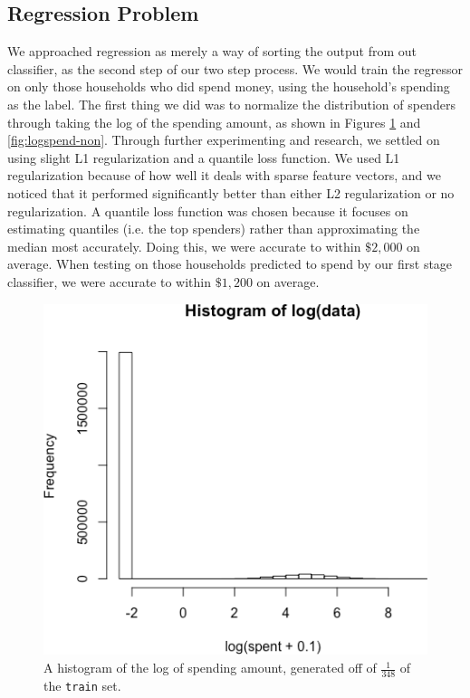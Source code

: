 \documentclass{article}
\begin{document}
\subsection*{Regression Problem}
We approached regression as merely a way of sorting the output from out classifier, as the second step of our two step process. We would train the regressor on only those households who did spend money, using the household's spending as the label. The first thing we did was to normalize the distribution of spenders through taking the log of the spending amount, as shown in Figures \ref{fig:logspend} and \ref{fig:logspend-non}. Through further experimenting and research, we settled on using slight L1 regularization and a quantile loss function. We used L1 regularization because of how well it deals with sparse feature vectors, and we noticed that it performed significantly better than either L2 regularization or no regularization. A quantile loss function was chosen because it focuses on estimating quantiles (i.e. the top spenders) rather than approximating the median most accurately. Doing this, we were accurate to within $\$2,000$ on average. When testing on those households predicted to spend by our first stage classifier, we were accurate to within $\$1,200$ on average.

\begin{figure}[H]
\begin{center}
	\includegraphics[width=.8 \linewidth]{log-spend.png}
\end{center}
	\vspace{-1em}
	\caption{A histogram of the log of spending amount, generated off of $\frac{1}{348}$ of the \texttt{train} set.}
	\label{fig:logspend}
\end{figure}
\end{document}
